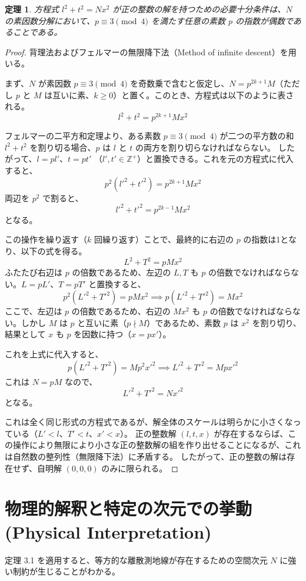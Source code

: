 \documentclass[a4paper,11pt]{ltjsarticle}
\newtheorem{theorem}{定理}[section]
\begin{document}
\begin{theorem}
方程式 \(l^2 + t^2 = N x^2\) が正の整数の解を持つための必要十分条件は、\(N\) の素因数分解において、\(p \equiv 3 \pmod 4\) を満たす任意の素数 \(p\) の指数が偶数であることである。
\end{theorem}

\begin{proof}
背理法およびフェルマーの無限降下法（Method of infinite descent）を用いる。

まず、\(N\) が素因数 \(p \equiv 3 \pmod 4\) を奇数乗で含むと仮定し、\(N = p^{2k+1}M\)（ただし \(p\) と \(M\) は互いに素、\(k \ge 0\)）と置く。このとき、方程式は以下のように表される。
\[ l^2 + t^2 = p^{2k+1} M x^2 \]

フェルマーの二平方和定理より、ある素数 \(p \equiv 3 \pmod 4\) が二つの平方数の和 \(l^2 + t^2\) を割り切る場合、\(p\) は \(l\) と \(t\) の両方を割り切らなければならない。
したがって、\(l = p l'\)、\(t = p t'\) （\(l', t' \in \mathbb{Z}^+\)）と置換できる。これを元の方程式に代入すると、
\[ p^2(l'^2 + t'^2) = p^{2k+1} M x^2 \]
両辺を \(p^2\) で割ると、
\[ l'^2 + t'^2 = p^{2k-1} M x^2 \]
となる。

この操作を繰り返す（\(k\) 回繰り返す）ことで、最終的に右辺の \(p\) の指数は1となり、以下の式を得る。
\[ L^2 + T^2 = p M x^2 \]
ふたたび右辺は \(p\) の倍数であるため、左辺の \(L, T\) も \(p\) の倍数でなければならない。\(L = p L'\)、\(T = p T'\) と置換すると、
\[ p^2(L'^2 + T'^2) = p M x^2 \implies p(L'^2 + T'^2) = M x^2 \]
ここで、左辺は \(p\) の倍数であるため、右辺の \(M x^2\) も \(p\) の倍数でなければならない。しかし \(M\) は \(p\) と互いに素（\(p \nmid M\)）であるため、素数 \(p\) は \(x^2\) を割り切り、結果として \(x\) も \(p\) を因数に持つ（\(x = p x'\)）。

これを上式に代入すると、
\[ p(L'^2 + T'^2) = M p^2 x'^2 \implies L'^2 + T'^2 = M p x'^2 \]
これは \(N = p M\) なので、
\[ L'^2 + T'^2 = N x'^2 \]
となる。

これは全く同じ形式の方程式であるが、解全体のスケールは明らかに小さくなっている（\(L' < l\)、\(T' < t\)、\(x' < x\)）。
正の整数解 \((l, t, x)\) が存在するならば、この操作により無限により小さな正の整数解の組を作り出せることになるが、これは自然数の整列性（無限降下法）に矛盾する。
したがって、正の整数の解は存在せず、自明解 \((0, 0, 0)\) のみに限られる。
\end{proof}

\section{物理的解釈と特定の次元での挙動 (Physical Interpretation)}
定理 3.1 を適用すると、等方的な離散測地線が存在するための空間次元 \(N\) に強い制約が生じることがわかる。
\end{document}
